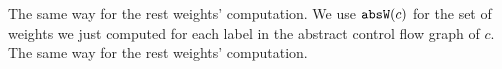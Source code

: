 The same way for the rest weights' computation.
We use $\mathtt{abs}{\mathtt{W}}(c)$ for the set of weights we just computed 
for each label in the abstract control flow graph of $c$.
%
The same way for the rest weights' computation.
